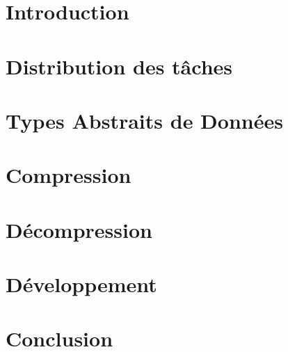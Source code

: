 \documentclass[10pt]{report}
\begin{document}
	
    
	
    \tableofcontents
	
    \chapter{Introduction} 
        

    \chapter{Distribution des tâches}
        
    
    \chapter{Types Abstraits de Données}
        

    \chapter{Compression}
        
    
    \chapter{Décompression}
        

    \chapter{Développement}
        

    \chapter{Conclusion}
        
\end{document}
